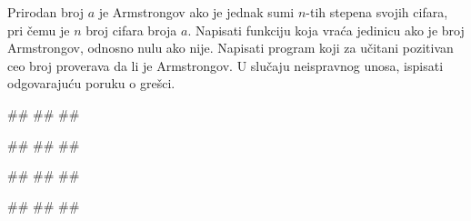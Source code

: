 \begin{Exercise}[label=FUN_20]
Prirodan broj $a$ je Armstrongov ako je jednak sumi $n$-tih stepena svojih
cifara, pri čemu je $n$ broj cifara broja $a$.  Napisati funkciju
 koja vraća jedinicu ako je broj Armstrongov,
odnosno nulu ako nije.  Napisati program koji za učitani pozitivan ceo broj
proverava da li je Armstrongov.
U slučaju neispravnog unosa, ispisati odgovarajuću poruku o grešci. 

\begin{miditest}
\begin{upotreba}{1}
#\naslovInt#
##
##
\end{upotreba}
\end{miditest}
\begin{miditest}
\begin{upotreba}{2}
#\naslovInt#
##
##
\end{upotreba}
\end{miditest}

\begin{miditest}
\begin{upotreba}{3}
#\naslovInt#
##
##
\end{upotreba}
\end{miditest}
\begin{miditest}
\begin{upotreba}{4}
#\naslovInt#
##
##
\end{upotreba}
\end{miditest}

\end{Exercise}
\ifresenja 
\begin{Answer}[ref=FUN_20]
\end{Answer} 
\fi



